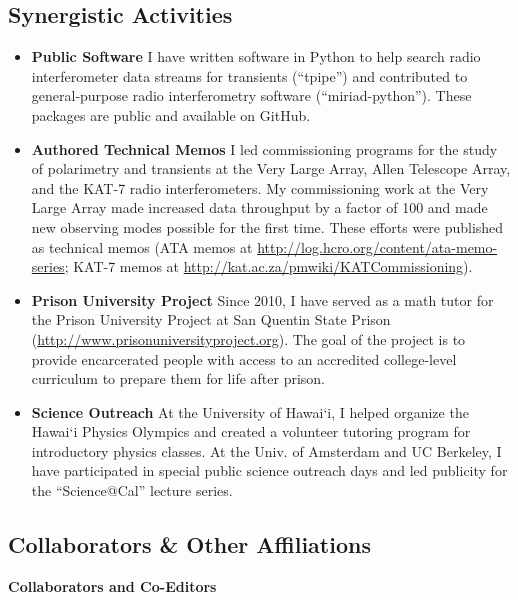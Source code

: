 \documentclass[11pt]{article}
\begin{document}
\subsection*{Synergistic Activities}

\begin{itemize}
 \item {\bf Public Software} I have written software in Python to help search radio interferometer data streams for transients (``tpipe'') and contributed to general-purpose radio interferometry software (``miriad-python''). These packages are public and available on GitHub.

 \item {\bf Authored Technical Memos} I led commissioning programs for the study of polarimetry and transients at the Very Large Array, Allen Telescope Array, and the KAT-7 radio interferometers. My commissioning work at the Very Large Array made increased data throughput by a factor of 100 and made new observing modes possible for the first time. These efforts were published as technical memos (ATA memos at \url{http://log.hcro.org/content/ata-memo-series}; KAT-7 memos at \url{http://kat.ac.za/pmwiki/KATCommissioning}).

 \item {\bf Prison University Project} Since 2010, I have served as a math tutor for the Prison University Project at San Quentin State Prison (\url{http://www.prisonuniversityproject.org}). The goal of the project is to provide encarcerated people with access to an accredited college-level curriculum to prepare them for life after prison.

 \item {\bf Science Outreach} At the University of Hawai`i, I helped organize the Hawai`i Physics Olympics and created a volunteer tutoring program for introductory physics classes. At the Univ. of Amsterdam and UC Berkeley, I have participated in special public science outreach days and led publicity for the ``Science@Cal'' lecture series.

\end{itemize}

\subsection*{Collaborators \& Other Affiliations}
\indent

{\bf Collaborators and Co-Editors}
\end{document}
